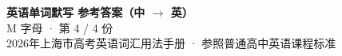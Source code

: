 \documentclass[10pt,a4paper]{article}
\begin{document}
\pagestyle{plain}

\begin{center}
{\LARGE\bfseries 英语单词默写 \quad 参考答案（中 $\to$ 英）}\\[0.22em]
{\large M 字母 · 第 4 / 4 份}\\[0.18em]
{\small 2026年上海市高考英语词汇用法手册 · 参照普通高中英语课程标准}
\end{center}

\vspace{0.2em}
\noindent{\color{rulegray}\rule{\textwidth}{0.8pt}}

\vspace{0.35em}

\vspace{0.25em}
\renewcommand{\arraystretch}{1.32}
\end{document}

